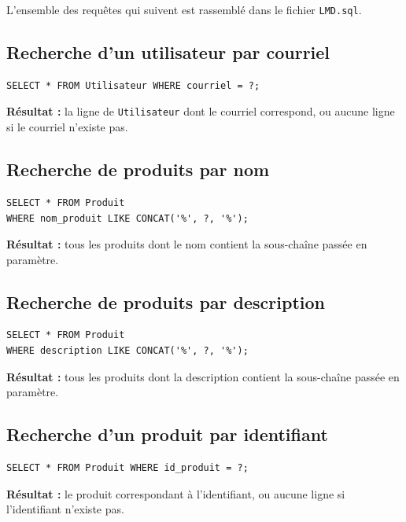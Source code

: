 \documentclass{article}
\theoremstyle{plain}
\theoremstyle{definition}
\begin{document}
L'ensemble des requêtes qui suivent est rassemblé dans le fichier
\texttt{LMD.sql}.
 
\subsection*{Recherche d'un utilisateur par courriel}
 
\begin{verbatim}
SELECT * FROM Utilisateur WHERE courriel = ?;
\end{verbatim}
 
\noindent\textbf{Résultat :} la ligne de \texttt{Utilisateur} dont le
courriel correspond, ou aucune ligne si le courriel n'existe pas.
 
\subsection*{Recherche de produits par nom}
 
\begin{verbatim}
SELECT * FROM Produit
WHERE nom_produit LIKE CONCAT('%', ?, '%');
\end{verbatim}
 
\noindent\textbf{Résultat :} tous les produits dont le nom contient la
sous-chaîne passée en paramètre.
 
\subsection*{Recherche de produits par description}
 
\begin{verbatim}
SELECT * FROM Produit
WHERE description LIKE CONCAT('%', ?, '%');
\end{verbatim}
 
\noindent\textbf{Résultat :} tous les produits dont la description
contient la sous-chaîne passée en paramètre.
 
\subsection*{Recherche d'un produit par identifiant}
 
\begin{verbatim}
SELECT * FROM Produit WHERE id_produit = ?;
\end{verbatim}
 
\noindent\textbf{Résultat :} le produit correspondant à l'identifiant,
ou aucune ligne si l'identifiant n'existe pas.
 
\end{document}
